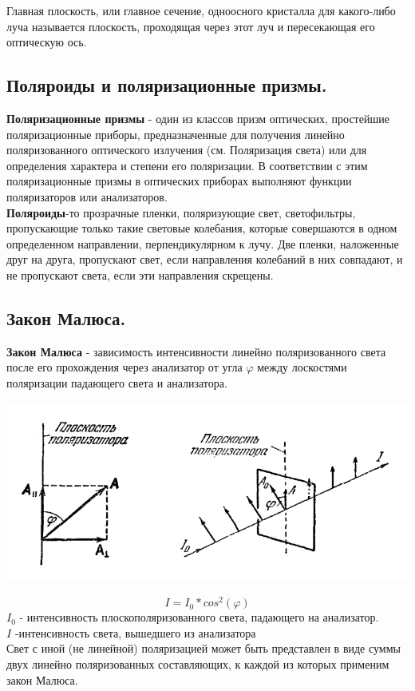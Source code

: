 \documentclass[12pt]{report}
\begin{document}
Главная плоскость, или главное сечение, одноосного кристалла для какого-либо луча называется плоскость, проходящая через этот луч и
пересекающая его оптическую ось.\\
\subsection{ Поляроиды и поляризационные призмы.}
\textbf{Поляризационные призмы} - один из классов призм оптических, простейшие поляризационные приборы, предназначенные для получения линейно поляризованного оптического излучения (см. Поляризация света) или для определения характера и степени его поляризации. В соответствии с этим поляризационные призмы в оптических приборах выполняют функции поляризаторов или анализаторов.\\

\textbf{Поляроиды}-то прозрачные пленки, поляризующие свет, светофильтры, пропускающие только такие световые колебания, которые совершаются в одном определенном направлении, перпендикулярном к лучу. Две пленки, наложенные друг на друга, пропускают свет, если направления колебаний в них совпадают, и не пропускают света, если эти направления скрещены.
\subsection{ Закон Малюса.}
\textbf{Закон Малюса} - зависимость интенсивности линейно поляризованного света после его прохождения через анализатор от угла $\varphi$ между лоскостями поляризации падающего света и анализатора.

\begin{center}
    \includegraphics[scale=0.7]{graphics/30_2.png}
\end{center}

\[
    I=I_0*cos^2(\varphi)
\]
$I_0$ - интенсивность плоскополяризованного
света, падающего на анализатор.\\
$I$ -интенсивность света, вышедшего из
анализатора\\
Свет с иной (не линейной) поляризацией может быть
представлен в виде суммы двух линейно поляризованных
составляющих, к каждой из которых применим закон Малюса.
\end{document}
